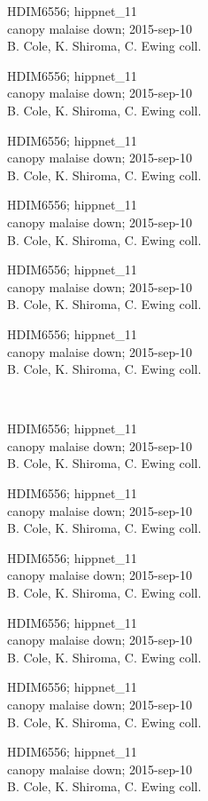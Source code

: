 \documentclass[2pt]{extarticle}
\begin{document}
\noindent
\parbox{0.16\textwidth}{\tiny \raggedright \rule[-0.3\baselineskip]{0pt}{10pt}HDIM6556; hippnet\_11\\ canopy malaise down; 2015-sep-10\\ B. Cole, K. Shiroma, C. Ewing coll.}
\parbox{0.16\textwidth}{\tiny \raggedright \rule[-0.3\baselineskip]{0pt}{10pt}HDIM6556; hippnet\_11\\ canopy malaise down; 2015-sep-10\\ B. Cole, K. Shiroma, C. Ewing coll.}
\parbox{0.16\textwidth}{\tiny \raggedright \rule[-0.3\baselineskip]{0pt}{10pt}HDIM6556; hippnet\_11\\ canopy malaise down; 2015-sep-10\\ B. Cole, K. Shiroma, C. Ewing coll.}
\parbox{0.16\textwidth}{\tiny \raggedright \rule[-0.3\baselineskip]{0pt}{10pt}HDIM6556; hippnet\_11\\ canopy malaise down; 2015-sep-10\\ B. Cole, K. Shiroma, C. Ewing coll.}
\parbox{0.16\textwidth}{\tiny \raggedright \rule[-0.3\baselineskip]{0pt}{10pt}HDIM6556; hippnet\_11\\ canopy malaise down; 2015-sep-10\\ B. Cole, K. Shiroma, C. Ewing coll.}
\parbox{0.16\textwidth}{\tiny \raggedright \rule[-0.3\baselineskip]{0pt}{10pt}HDIM6556; hippnet\_11\\ canopy malaise down; 2015-sep-10\\ B. Cole, K. Shiroma, C. Ewing coll.} \\ 
\vspace{0.001in} 

\noindent
\parbox{0.16\textwidth}{\tiny \raggedright \rule[-0.3\baselineskip]{0pt}{10pt}HDIM6556; hippnet\_11\\ canopy malaise down; 2015-sep-10\\ B. Cole, K. Shiroma, C. Ewing coll.}
\parbox{0.16\textwidth}{\tiny \raggedright \rule[-0.3\baselineskip]{0pt}{10pt}HDIM6556; hippnet\_11\\ canopy malaise down; 2015-sep-10\\ B. Cole, K. Shiroma, C. Ewing coll.}
\parbox{0.16\textwidth}{\tiny \raggedright \rule[-0.3\baselineskip]{0pt}{10pt}HDIM6556; hippnet\_11\\ canopy malaise down; 2015-sep-10\\ B. Cole, K. Shiroma, C. Ewing coll.}
\parbox{0.16\textwidth}{\tiny \raggedright \rule[-0.3\baselineskip]{0pt}{10pt}HDIM6556; hippnet\_11\\ canopy malaise down; 2015-sep-10\\ B. Cole, K. Shiroma, C. Ewing coll.}
\parbox{0.16\textwidth}{\tiny \raggedright \rule[-0.3\baselineskip]{0pt}{10pt}HDIM6556; hippnet\_11\\ canopy malaise down; 2015-sep-10\\ B. Cole, K. Shiroma, C. Ewing coll.}
\parbox{0.16\textwidth}{\tiny \raggedright \rule[-0.3\baselineskip]{0pt}{10pt}HDIM6556; hippnet\_11\\ canopy malaise down; 2015-sep-10\\ B. Cole, K. Shiroma, C. Ewing coll.} \\ 
\vspace{0.001in} 
\end{document}
